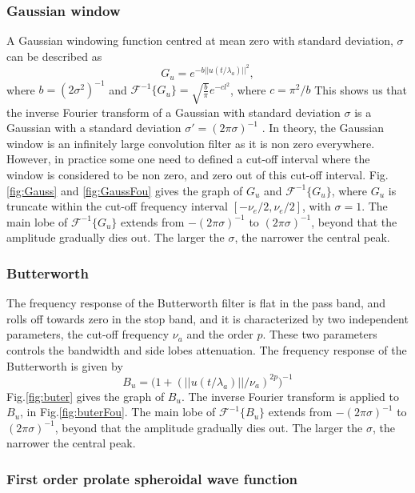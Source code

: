 \documentclass[useAMS,usenatbib]{mn2e}
\begin{document}
\subsubsection{Gaussian window}
A Gaussian windowing function centred at mean zero with standard deviation, $\sigma$ can be described as 
\begin{equation}
  G_{u}= e^{-b||u(t/\lambda_a)||^{2}},
\end{equation}
where $b=(2\sigma^2)^{-1}$ and  $\mathcal{F}^{-1}\big\{G_{u}\big\}=\sqrt{\frac{b}{\pi}}e^{-cl^2}$, where $c=\pi^2/b$
This shows us that the inverse Fourier transform of a Gaussian with standard deviation $\sigma$ is a Gaussian with a standard 
deviation $\sigma '= (2\pi\sigma)^{-1}$ . In theory, the Gaussian window is an infinitely large convolution filter as it is non zero 
everywhere. However, in practice some one need to defined a cut-off interval where the window is considered to be non zero, and zero out of 
this cut-off interval. 
Fig.\ref{fig:Gauss} and \ref{fig:GaussFou} gives the graph of $G_{u}$ and $\mathcal{F}^{-1}\big\{G_{u}\big\}$, where $G_{u}$ is truncate 
within the cut-off frequency interval $[-\nu_e/2,\nu_e/2]$, with $\sigma =1$. The main lobe of $\mathcal{F}^{-1}\big\{G_{u}\big\}$ extends 
from $-(2\pi\sigma)^{-1}$ to $(2\pi\sigma)^{-1}$, beyond that the amplitude gradually dies out. The larger the $\sigma$, the narrower the 
central peak.
\subsubsection{Butterworth}
The frequency response of the Butterworth filter is flat  in the pass band, and rolls off towards zero in the stop band, and it is 
characterized by two independent parameters, the cut-off frequency 
$\nu_a$ and the order $p$. These two parameters controls the 
bandwidth and side lobes  attenuation. The frequency response of the Butterworth is given by 
\begin{equation}
B_u= \Big(1 + (||u(t/\lambda_a)||/\nu_a)^{2p}\Big)^{-1}
\end{equation}
Fig.\ref{fig:buter} gives the graph of $B_{u}$. The inverse  Fourier transform is applied to $B_{u}$, in Fig.\ref{fig:buterFou}. The main 
lobe of 
$\mathcal{F}^{-1}\big\{B_{u}\big\}$ extends from $-(2\pi\sigma)^{-1}$ to $(2\pi\sigma)^{-1}$, beyond that the amplitude gradually dies out. 
The larger the $\sigma$, the narrower the central peak.
\subsubsection{First order prolate spheroidal wave function}
\end{document}
